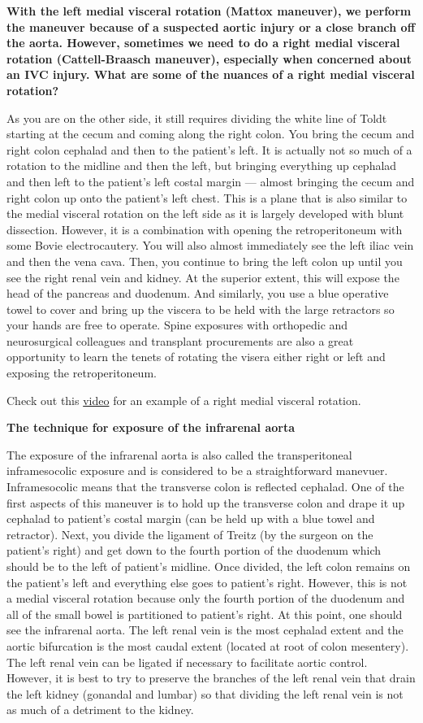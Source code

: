 \documentclass[
]{book}
\begin{document}
\textbf{With the left medial visceral rotation (Mattox maneuver), we perform
the maneuver because of a suspected aortic injury or a close branch off
the aorta. However, sometimes we need to do a right medial visceral
rotation (Cattell-Braasch maneuver), especially when concerned about an
IVC injury. What are some of the nuances of a right medial visceral
rotation?}

As you are on the other side, it still requires dividing the white line
of Toldt starting at the cecum and coming along the right colon. You
bring the cecum and right colon cephalad and then to the patient's left.
It is actually not so much of a rotation to the midline and then the
left, but bringing everything up cephalad and then left to the patient's
left costal margin --- almost bringing the cecum and right colon up onto
the patient's left chest. This is a plane that is also similar to the
medial visceral rotation on the left side as it is largely developed
with blunt dissection. However, it is a combination with opening the
retroperitoneum with some Bovie electrocautery. You will also almost
immediately see the left iliac vein and then the vena cava. Then, you
continue to bring the left colon up until you see the right renal vein
and kidney. At the superior extent, this will expose the head of the
pancreas and duodenum. And similarly, you use a blue operative towel to
cover and bring up the viscera to be held with the large retractors so
your hands are free to operate. Spine exposures with orthopedic and
neurosurgical colleagues and transplant procurements are also a great
opportunity to learn the tenets of rotating the visera either right or
left and exposing the retroperitoneum.

Check out this \href{https://www.youtube.com/watch?v=KVuMiAuw5zc}{video} for an example of a right medial visceral rotation.

\textbf{The technique for exposure of the infrarenal aorta}

The exposure of the infrarenal aorta is also called the transperitoneal
inframesocolic exposure and is considered to be a straightforward
manevuer. Inframesocolic means that the transverse colon is reflected
cephalad. One of the first aspects of this maneuver is to hold up the
transverse colon and drape it up cephalad to patient's costal margin
(can be held up with a blue towel and retractor). Next, you divide the
ligament of Treitz (by the surgeon on the patient's right) and get down
to the fourth portion of the duodenum which should be to the left of
patient's midline. Once divided, the left colon remains on the patient's
left and everything else goes to patient's right. However, this is not a
medial visceral rotation because only the fourth portion of the duodenum
and all of the small bowel is partitioned to patient's right. At this
point, one should see the infrarenal aorta. The left renal vein is the
most cephalad extent and the aortic bifurcation is the most caudal
extent (located at root of colon mesentery). The left renal vein can be
ligated if necessary to facilitate aortic control. However, it is best
to try to preserve the branches of the left renal vein that drain the
left kidney (gonandal and lumbar) so that dividing the left renal vein
is not as much of a detriment to the kidney.
\end{document}
